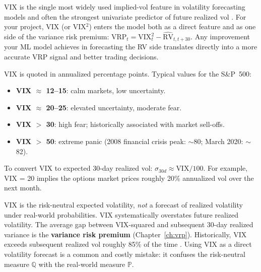 \begin{projectconnection}
VIX is the single most widely used implied-vol feature in volatility forecasting models and often the strongest univariate predictor of future realized vol \citep{Gu2020}.
For your project, VIX (or VIX$^2$) enters the model both as a direct feature and as one side of the variance risk premium: $\text{VRP}_t = \text{VIX}_t^2 - \widehat{\text{RV}}_{t,t+30}$.
Any improvement your ML model achieves in forecasting the RV side translates directly into a more accurate VRP signal and better trading decisions.
\end{projectconnection}

\begin{keyidea}
VIX is quoted in annualized percentage points.
Typical values for the S\&P~500:
\begin{itemize}[nosep]
  \item \textbf{VIX $\approx$ 12--15}: calm markets, low uncertainty.
  \item \textbf{VIX $\approx$ 20--25}: elevated uncertainty, moderate fear.
  \item \textbf{VIX $>$ 30}: high fear; historically associated with market sell-offs.
  \item \textbf{VIX $>$ 50}: extreme panic (2008 financial crisis peak: $\sim$80; March 2020: $\sim$82).
\end{itemize}
To convert VIX to expected 30-day realized vol: $\sigma_{30d} \approx \text{VIX}/100$.
For example, VIX = 20 implies the options market prices roughly 20\% annualized vol over the next month.
\end{keyidea}

\begin{warning}
VIX is the risk-neutral expected volatility, \emph{not} a forecast of realized volatility under real-world probabilities.
VIX systematically overstates future realized volatility.
The average gap between VIX-squared and subsequent 30-day realized variance is the \textbf{variance risk premium} (Chapter~\ref{ch:vrp}).
Historically, VIX exceeds subsequent realized vol roughly 85\% of the time \citep{Carr2009}.
Using VIX as a direct volatility forecast is a common and costly mistake: it confuses the risk-neutral measure $\mathbb{Q}$ with the real-world measure $\mathbb{P}$.
\end{warning}

